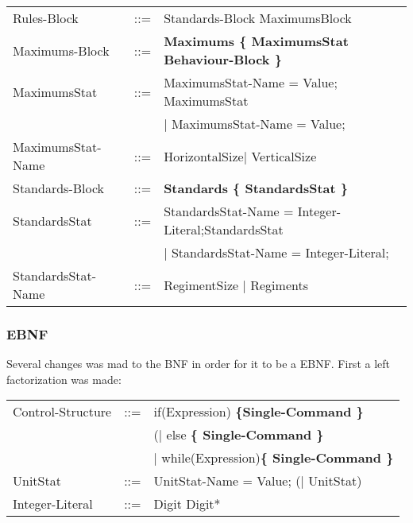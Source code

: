 \begin{tabular}{ l l l }
			Rules-Block		   &	::=	 & Standards-Block MaximumsBlock 				\\
			Maximums-Block	   &	::=	 & \bf{Maximums} \bf{\{} MaximumsStat Behaviour-Block \bf{\}}	\\
			MaximumsStat	   &	::=  & MaximumsStat-Name = Value; MaximumsStat  \\
							   &		 & $\mid$ MaximumsStat-Name = Value;   \\
			MaximumsStat-Name  &	::=  & HorizontalSize$\mid$ VerticalSize					\\
			Standards-Block	   &    ::=  & \bf{Standards} \bf{\{ } StandardsStat \bf{\} }	\\
			StandardsStat	   & 	::=	 & StandardsStat-Name = Integer-Literal;StandardsStat \\
							   &		 & $\mid$ StandardsStat-Name = Integer-Literal; \\
			StandardsStat-Name & 	::=	 & RegimentSize	$\mid$ Regiments \\
		\end{tabular}
		
	\subsubsection{EBNF}
		Several changes was mad to the BNF in order for it to be a EBNF. First a left factorization was made:
		\begin{tabular}{ l l l }
			Control-Structure  &  	::=  & if(Expression) \bf{\{}Single-Command \bf{\}}  \\
							   &  	     & (\epsilon $\mid$ else \bf{\{ }Single-Command \bf{\} } \\					   
							   &   		 & $\mid$ while(Expression)\bf{\{ } Single-Command \bf{\}} \\
	  		UnitStat		   &	::=  & UnitStat-Name = Value; (\epsilon $\mid$ UnitStat) \\
			Integer-Literal    &	::=  & Digit Digit* 
			
								
		\end{tabular}
							   
							   